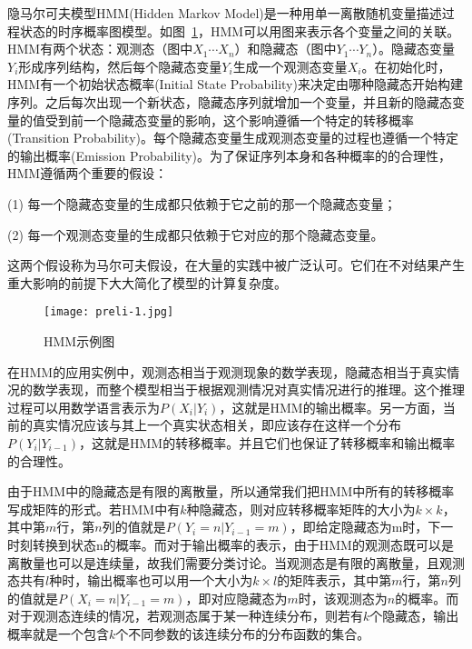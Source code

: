 隐马尔可夫模型HMM(Hidden Markov Model)是一种用单一离散随机变量描述过程状态的时序概率图模型。如图~\ref{fig:hmm}，HMM可以用图来表示各个变量之间的关联。HMM有两个状态：观测态（图中$X_1 \cdots X_n$）和隐藏态（图中$Y_1 \cdots Y_n$）。隐藏态变量$Y_i$形成序列结构，然后每个隐藏态变量$Y_i$生成一个观测态变量$X_i$。在初始化时，HMM有一个初始状态概率(Initial State Probability)来决定由哪种隐藏态开始构建序列。之后每次出现一个新状态，隐藏态序列就增加一个变量，并且新的隐藏态变量的值受到前一个隐藏态变量的影响，这个影响遵循一个特定的转移概率(Transition Probability)。每个隐藏态变量生成观测态变量的过程也遵循一个特定的输出概率(Emission Probability)。为了保证序列本身和各种概率的的合理性，HMM遵循两个重要的假设：
\begin{enumerate*}		
	\item[(1)] 每一个隐藏态变量的生成都只依赖于它之前的那一个隐藏态变量；
	\item[(2)] 每一个观测态变量的生成都只依赖于它对应的那个隐藏态变量。
\end{enumerate*}
这两个假设称为马尔可夫假设，在大量的实践中被广泛认可。它们在不对结果产生重大影响的前提下大大简化了模型的计算复杂度。

\begin{figure}[htbp]
	\centering
	\begin{minipage}[htbp]{\textwidth}
		\centering
		\texttt{[image: preli-1.jpg]}
		\caption[HMM示例图]
		{HMM示例图\label{fig:hmm}}		
	\end{minipage}     
\end{figure}


在HMM的应用实例中，观测态相当于观测现象的数学表现，隐藏态相当于真实情况的数学表现，而整个模型相当于根据观测情况对真实情况进行的推理。这个推理过程可以用数学语言表示为$P(X_i |Y_i)$，这就是HMM的输出概率。另一方面，当前的真实情况应该与其上一个真实状态相关，即应该存在这样一个分布$P(Y_i | Y_{i-1})$，这就是HMM的转移概率。并且它们也保证了转移概率和输出概率的合理性。


由于HMM中的隐藏态是有限的离散量，所以通常我们把HMM中所有的转移概率写成矩阵的形式。若HMM中有$k$种隐藏态，则对应转移概率矩阵的大小为$k \times k$，其中第$m$行，第$n$列的值就是$P(Y_i = n | Y_{i-1} = m)$，即给定隐藏态为m时，下一时刻转换到状态n的概率。而对于输出概率的表示，由于HMM的观测态既可以是离散量也可以是连续量，故我们需要分类讨论。当观测态是有限的离散量，且观测态共有$l$种时，输出概率也可以用一个大小为$k \times l$的矩阵表示，其中第$m$行，第$n$列的值就是$P(X_i = n | Y_{i-1} = m)$，即对应隐藏态为$m$时，该观测态为$n$的概率。而对于观测态连续的情况，若观测态属于某一种连续分布，则若有$k$个隐藏态，输出概率就是一个包含$k$个不同参数的该连续分布的分布函数的集合。


